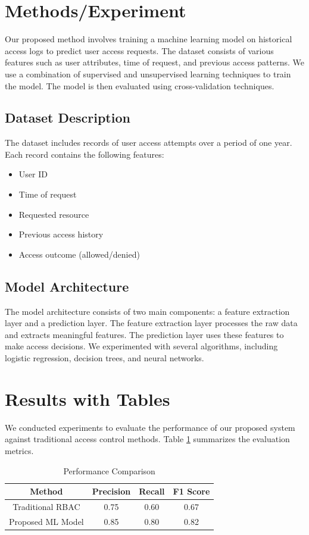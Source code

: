 \section{Methods/Experiment}
Our proposed method involves training a machine learning model on historical access logs to predict user access requests. The dataset consists of various features such as user attributes, time of request, and previous access patterns. We use a combination of supervised and unsupervised learning techniques to train the model. The model is then evaluated using cross-validation techniques.

\subsection{Dataset Description}
The dataset includes records of user access attempts over a period of one year. Each record contains the following features:
\begin{itemize}
    \item User ID
    \item Time of request
    \item Requested resource
    \item Previous access history
    \item Access outcome (allowed/denied)
\end{itemize}

\subsection{Model Architecture}
The model architecture consists of two main components: a feature extraction layer and a prediction layer. The feature extraction layer processes the raw data and extracts meaningful features. The prediction layer uses these features to make access decisions. We experimented with several algorithms, including logistic regression, decision trees, and neural networks.

\section{Results with Tables}
We conducted experiments to evaluate the performance of our proposed system against traditional access control methods. Table \ref{tab:results} summarizes the evaluation metrics.

\begin{table}[ht]
\centering
\caption{Performance Comparison}
\label{tab:results}
\begin{tabular}{|c|c|c|c|}
\hline
\textbf{Method} & \textbf{Precision} & \textbf{Recall} & \textbf{F1 Score} \\
\hline
Traditional RBAC & 0.75 & 0.60 & 0.67 \\
Proposed ML Model & 0.85 & 0.80 & 0.82 \\
\hline
\end{tabular}
\end{table}

